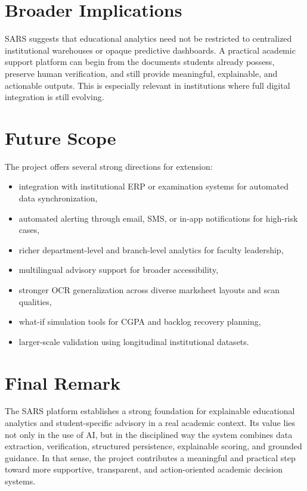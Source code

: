 \section{Broader Implications}
SARS suggests that educational analytics need not be restricted to centralized institutional warehouses or opaque predictive dashboards. A practical academic support platform can begin from the documents students already possess, preserve human verification, and still provide meaningful, explainable, and actionable outputs. This is especially relevant in institutions where full digital integration is still evolving.

\section{Future Scope}
The project offers several strong directions for extension:
\begin{itemize}[leftmargin=*]
\item integration with institutional ERP or examination systems for automated data synchronization,
\item automated alerting through email, SMS, or in-app notifications for high-risk cases,
\item richer department-level and branch-level analytics for faculty leadership,
\item multilingual advisory support for broader accessibility,
\item stronger OCR generalization across diverse marksheet layouts and scan qualities,
\item what-if simulation tools for CGPA and backlog recovery planning,
\item larger-scale validation using longitudinal institutional datasets.
\end{itemize}

\section{Final Remark}
The SARS platform establishes a strong foundation for explainable educational analytics and student-specific advisory in a real academic context. Its value lies not only in the use of AI, but in the disciplined way the system combines data extraction, verification, structured persistence, explainable scoring, and grounded guidance. In that sense, the project contributes a meaningful and practical step toward more supportive, transparent, and action-oriented academic decision systems.

